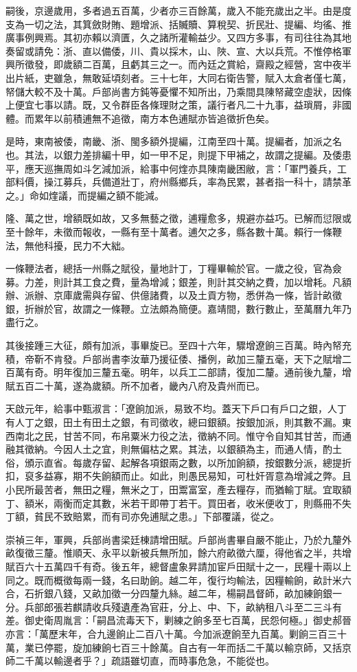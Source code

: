 嗣後，京邊歲用，多者過五百萬，少者亦三百餘萬，歲入不能充歲出之半。由是度支為一切之法，其箕斂財賄、題增派、括贓贖、算稅契、折民壯、提編、均徭、推廣事例興焉。其初亦賴以濟匱，久之諸所灌輸益少。又四方多事，有司往往為其地奏留或請免：浙、直以備倭，川、貴以採木，山、陜、宣、大以兵荒。不惟停格軍興所徵發，即歲額二百萬，且虧其三之一。而內廷之賞給，齋殿之經營，宮中夜半出片紙，吏雖急，無敢延頃刻者。三十七年，大同右衛告警，賦入太倉者僅七萬，帑儲大較不及十萬。戶部尚書方鈍等憂懼不知所出，乃乘間具陳帑藏空虛狀，因條上便宜七事以請。既，又令群臣各條理財之策，議行者凡二十九事，益瑣屑，非國體。而累年以前積逋無不追徵，南方本色逋賦亦皆追徵折色矣。

是時，東南被倭，南畿、浙、閩多額外提編，江南至四十萬。提編者，加派之名也。其法，以銀力差排編十甲，如一甲不足，則提下甲補之，故謂之提編。及倭患平，應天巡撫周如斗乞減加派，給事中何煃亦具陳南畿困敝，言：「軍門養兵，工部料價，操江募兵，兵備道壯丁，府州縣鄉兵，率為民累，甚者指一科十，請禁革之。」命如煃議，而提編之額不能減。

隆、萬之世，增額既如故，又多無藝之徵，逋糧愈多，規避亦益巧。已解而愆限或至十餘年，未徵而報收，一縣有至十萬者。逋欠之多，縣各數十萬。賴行一條鞭法，無他科擾，民力不大絀。

一條鞭法者，總括一州縣之賦役，量地計丁，丁糧畢輸於官。一歲之役，官為僉募。力差，則計其工食之費，量為增減；銀差，則計其交納之費，加以增耗。凡額辦、派辦、京庫歲需與存留、供億諸費，以及土貢方物，悉併為一條，皆計畝徵銀，折辦於官，故謂之一條鞭。立法頗為簡便。嘉靖間，數行數止，至萬曆九年乃盡行之。

其後接踵三大征，頗有加派，事畢旋已。至四十六年，驟增遼餉三百萬。時內帑充積，帝靳不肯發。戶部尚書李汝華乃援征倭、播例，畝加三釐五毫，天下之賦增二百萬有奇。明年復加三釐五毫。明年，以兵工二部請，復加二釐。通前後九釐，增賦五百二十萬，遂為歲額。所不加者，畿內八府及貴州而已。

天啟元年，給事中甄淑言：「遼餉加派，易致不均。蓋天下戶口有戶口之銀，人丁有人丁之銀，田土有田土之銀，有司徵收，總曰銀額。按銀加派，則其數不漏。東西南北之民，甘苦不同，布帛粟米力役之法，徵納不同。惟守令自知其甘苦，而通融其徵納。今因人土之宜，則無偏枯之累。其法，以銀額為主，而通人情，酌土俗，頒示直省。每歲存留、起解各項銀兩之數，以所加餉額，按銀數分派，總提折扣，裒多益寡，期不失餉額而止。如此，則愚民易知，可杜奸胥意為增減之弊。且小民所最苦者，無田之糧，無米之丁，田鬻富室，產去糧存，而猶輸丁賦。宜取額丁、額米，兩衡而定其數，米若干即帶丁若干。買田者，收米便收丁，則縣冊不失丁額，貧民不致賠累，而有司亦免逋賦之患。」下部覆議，從之。

崇禎三年，軍興，兵部尚書梁廷棟請增田賦。戶部尚書畢自嚴不能止，乃於九釐外畝復徵三釐。惟順天、永平以新被兵無所加，餘六府畝徵六厘，得他省之半，共增賦百六十五萬四千有奇。後五年，總督盧象昇請加宦戶田賦十之一，民糧十兩以上同之。既而概徵每兩一錢，名曰助餉。越二年，復行均輸法，因糧輸餉，畝計米六合，石折銀八錢，又畝加徵一分四釐九絲。越二年，楊嗣昌督師，畝加練餉銀一分。兵部郎張若麒請收兵殘遺產為官莊，分上、中、下，畝納租八斗至二三斗有差。御史衛周胤言：「嗣昌流毒天下，剿練之餉多至七百萬，民怨何極。」御史郝晉亦言：「萬歷末年，合九邊餉止二百八十萬。今加派遼餉至九百萬。剿餉三百三十萬，業已停罷，旋加練餉七百三十餘萬。自古有一年而括二千萬以輸京師，又括京師二千萬以輸邊者乎？」疏語雖切直，而時事危急，不能從也。

